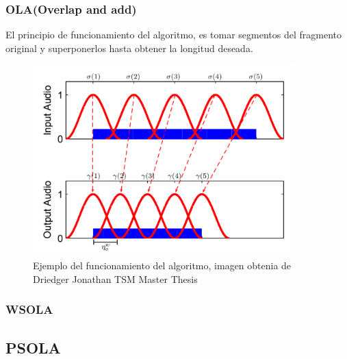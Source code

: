 \documentclass[../ASSD_TP2.tex]{subfiles}
\begin{document}
\subsubsection*{OLA(Overlap and add)}
El principio de funcionamiento del algoritmo, es tomar segmentos del fragmento original y superponerlos hasta obtener la longitud deseada.
\begin{figure}


  \centering
   \includegraphics[width=0.9\textwidth]{figures/ola.png}
  \caption{Ejemplo del funcionamiento del algoritmo, imagen obtenia de Driedger Jonathan TSM Master Thesis}
\end{figure}
\subsubsection*{WSOLA}

\subsection*{PSOLA}
\end{document}
